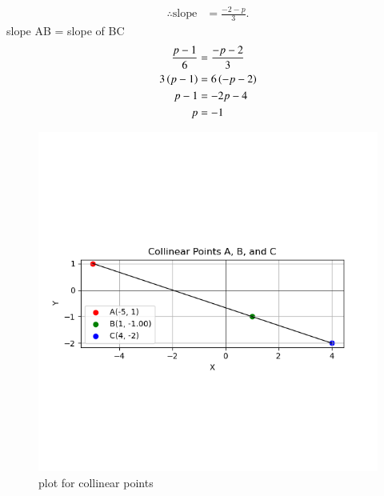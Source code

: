 \documentclass[journal]{IEEEtran}
\begin{document}
    \begin{align}
          \therefore \text{slope} &= \frac{-2-p}{3}. \label{eq 1-1.7-5-2}
\end{align}
slope AB = slope of BC\\
\begin{align*}
    \frac{p-1}{6} &= \frac{-p-2}{3}\\
    3\left(p-1\right) &= 6\left(-p-2\right)\\
    p - 1 &= -2p - 4\\
        p &= -1\\
\end{align*}


\begin{figure}[h!]
\centering
\includegraphics[width=0.7\columnwidth]{figs/Figure_1.png}
 \caption{plot for collinear points}
  \label{fig. 1-1.2-18-1}
\end{figure}
\end{document}
